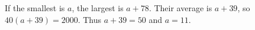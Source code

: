 If the smallest is $a$, the largest is $a+78$. Their average is $a+39$, so $40(a+39)=2000$. Thus $a+39=50$ and $\boxed{a=11}$.
